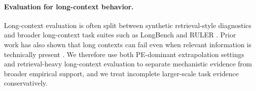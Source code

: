 \paragraph{Evaluation for long-context behavior.}
Long-context evaluation is often split between synthetic retrieval-style diagnostics and broader long-context task suites such as LongBench and RULER \citep{bai2024longbench, hsieh2024ruler}. Prior work has also shown that long contexts can fail even when relevant information is technically present \citep{liu2024lost}. We therefore use both PE-dominant extrapolation settings and retrieval-heavy long-context evaluation to separate mechanistic evidence from broader empirical support, and we treat incomplete larger-scale task evidence conservatively.
